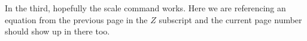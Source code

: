 \documentclass[12pt]{memoir}
\newif\ifNAT
\begin{document}
\newpage
In the third, hopefully the scale command works.
Here we are referencing an equation from the previous page in the $Z$ subscript and the current page number should show up in there too.

\begin{center}
\end{center}

\ifNAT
  
  
\else
  \printbibliography
\fi
\end{document}
